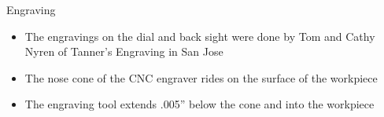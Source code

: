 \documentclass[final]{beamer}
\begin{document}
\begin{frame}
\begin{columns}[t]
\begin{column}[t]{0.24 \textwidth}
\begin{itemize}
\begin{itemize}
\begin{center}
\end{center}
\end{itemize}
\end{itemize}

\alert{Engraving}

\begin{itemize}
\item The engravings on the dial and back sight were done by Tom and Cathy
Nyren of Tanner's Engraving in San Jose
\item The nose cone of the CNC engraver rides on the surface of the workpiece
\item The engraving tool extends .005'' below the cone and into the workpiece


\end{itemize}
\end{column}
\end{columns}
\end{frame}
\end{document}
